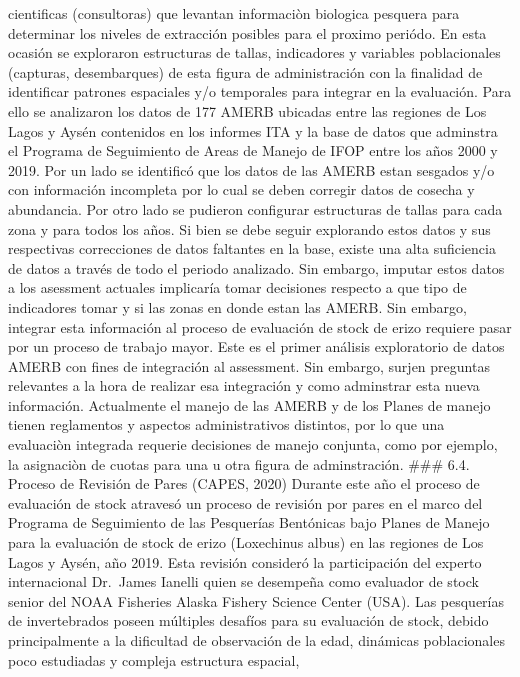\documentclass[
]{article}
\begin{document}
cientificas (consultoras) que levantan informaciòn biologica pesquera
para determinar los niveles de extracción posibles para el proximo
periódo. En esta ocasión se exploraron estructuras de tallas,
indicadores y variables poblacionales (capturas, desembarques) de esta
figura de administración con la finalidad de identificar patrones
espaciales y/o temporales para integrar en la evaluación. Para ello se
analizaron los datos de 177 AMERB ubicadas entre las regiones de Los
Lagos y Aysén contenidos en los informes ITA y la base de datos que
adminstra el Programa de Seguimiento de Areas de Manejo de IFOP entre
los años 2000 y 2019. Por un lado se identificó que los datos de las
AMERB estan sesgados y/o con información incompleta por lo cual se deben
corregir datos de cosecha y abundancia. Por otro lado se pudieron
configurar estructuras de tallas para cada zona y para todos los años.
Si bien se debe seguir explorando estos datos y sus respectivas
correcciones de datos faltantes en la base, existe una alta suficiencia
de datos a través de todo el periodo analizado. Sin embargo, imputar
estos datos a los asessment actuales implicaría tomar decisiones
respecto a que tipo de indicadores tomar y si las zonas en donde estan
las AMERB. Sin embargo, integrar esta información al proceso de
evaluación de stock de erizo requiere pasar por un proceso de trabajo
mayor. Este es el primer análisis exploratorio de datos AMERB con fines
de integración al assessment. Sin embargo, surjen preguntas relevantes a
la hora de realizar esa integración y como adminstrar esta nueva
información. Actualmente el manejo de las AMERB y de los Planes de
manejo tienen reglamentos y aspectos administrativos distintos, por lo
que una evaluaciòn integrada requerie decisiones de manejo conjunta,
como por ejemplo, la asignaciòn de cuotas para una u otra figura de
adminstración. \#\#\# 6.4. Proceso de Revisión de Pares (CAPES, 2020)
Durante este año el proceso de evaluación de stock atravesó un proceso
de revisión por pares en el marco del Programa de Seguimiento de las
Pesquerías Bentónicas bajo Planes de Manejo para la evaluación de stock
de erizo (Loxechinus albus) en las regiones de Los Lagos y Aysén, año
2019. Esta revisión consideró la participación del experto internacional
Dr.~James Ianelli quien se desempeña como evaluador de stock senior del
NOAA Fisheries Alaska Fishery Science Center (USA). Las pesquerías de
invertebrados poseen múltiples desafíos para su evaluación de stock,
debido principalmente a la dificultad de observación de la edad,
dinámicas poblacionales poco estudiadas y compleja estructura espacial,
\end{document}
